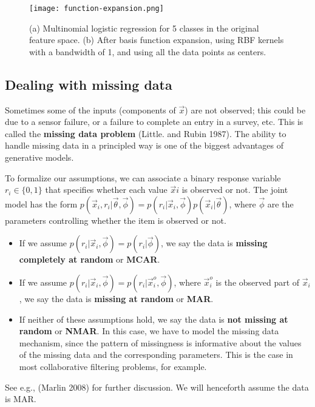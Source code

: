 \begin{longtable}{lllll}
\end{longtable}

\begin{figure}[hbtp]
\centering
    \texttt{[image: function-expansion.png]}
\caption{(a) Multinomial logistic regression for 5 classes in the original feature space. (b) After basis function expansion, using RBF kernels with a bandwidth of 1, and using all the data points as centers.}
\label{fig:function-expansion} 
\end{figure}


\subsection{Dealing with missing data}
\label{sec:Dealing-with-missing-data}
Sometimes some of the inputs (components of $\vec{x}$) are not observed; this could be due to a sensor failure, or a failure to complete an entry in a survey, etc. This is called the \textbf{missing data problem} (Little. and Rubin 1987). The ability to handle missing data in a principled way is one of the biggest advantages of generative models.

To formalize our assumptions, we can associate a binary response variable $r_i \in \{0,1\}$ that specifies whether each value $\vec{x}i$ is observed or not. The joint model has the form $p(\vec{x}_i,r_i|\vec{\theta},\vec{\phi})=p(r_i|\vec{x}_i,\vec{\phi})p(\vec{x}_i|\vec{\theta})$, where $\vec{\phi}$ are the parameters controlling whether the item is observed or not. 
\begin{itemize}
\item{If we assume $p(r_i|\vec{x}_i,\vec{\phi})=p(r_i|\vec{\phi})$, we say the data is \textbf{missing completely at random} or \textbf{MCAR}.}
\item{If we assume $p(r_i|\vec{x}_i,\vec{\phi})=p(r_i|\vec{x}_i^o,\vec{\phi})$, where $\vec{x}_i^o$ is the observed part of $\vec{x}_i$, we say the data is \textbf{missing at random} or \textbf{MAR}.}
\item{If neither of these assumptions hold, we say the data is \textbf{not missing at random} or \textbf{NMAR}. In this case, we have to model the missing data mechanism, since the pattern of missingness is informative about the values of the missing data and the corresponding parameters. This is the case in most collaborative filtering problems, for example.}
\end{itemize}

See e.g., (Marlin 2008) for further discussion. We will henceforth assume the data is MAR.


